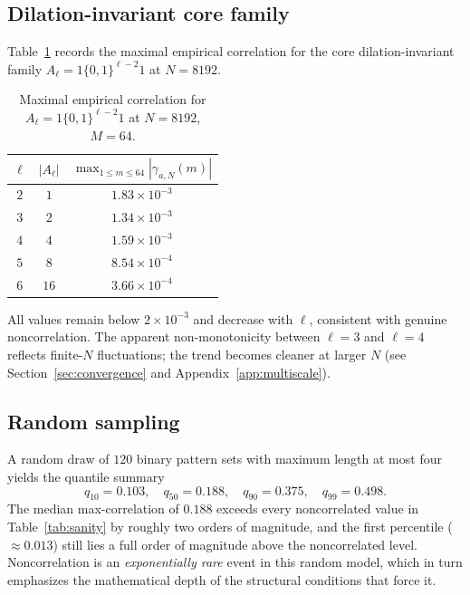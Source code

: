 \documentclass[11pt]{article}
\theoremstyle{definition}
\begin{document}
\subsection{Dilation-invariant core family}

Table~\ref{tab:family} records the maximal empirical correlation for
the core dilation-invariant family $A_\ell = 1\{0,1\}^{\ell-2}1$
at $N = 8192$.

\begin{table}[ht]
\centering
\caption{Maximal empirical correlation for $A_\ell = 1\{0,1\}^{\ell-2}1$
         at $N = 8192$, $M = 64$.}
\label{tab:family}
\begin{tabular}{ccc}
\toprule
$\ell$ & $|A_\ell|$
       & $\displaystyle\max_{1 \leq m \leq 64}|\gamma_{a,N}(m)|$ \\
\midrule
$2$ & $1$  & $1.83 \times 10^{-3}$ \\
$3$ & $2$  & $1.34 \times 10^{-3}$ \\
$4$ & $4$  & $1.59 \times 10^{-3}$ \\
$5$ & $8$  & $8.54 \times 10^{-4}$ \\
$6$ & $16$ & $3.66 \times 10^{-4}$ \\
\bottomrule
\end{tabular}
\end{table}

All values remain below $2 \times 10^{-3}$ and decrease with $\ell$,
consistent with genuine noncorrelation. The apparent non-monotonicity
between $\ell = 3$ and $\ell = 4$ reflects finite-$N$ fluctuations; the
trend becomes cleaner at larger $N$ (see Section~\ref{sec:convergence}
and Appendix~\ref{app:multiscale}).

\subsection{Random sampling}

A random draw of $120$ binary pattern sets with maximum length at most
four yields the quantile summary
\[
    q_{10} = 0.103,\quad
    q_{50} = 0.188,\quad
    q_{90} = 0.375,\quad
    q_{99} = 0.498.
\]
The median max-correlation of $0.188$ exceeds every noncorrelated
value in Table~\ref{tab:sanity} by roughly two orders of magnitude,
and the first percentile ($\approx 0.013$) still lies a full order of
magnitude above the noncorrelated level. Noncorrelation is
an \emph{exponentially rare} event in this random model, which in turn
emphasizes the mathematical depth of the structural conditions that
force it.
\end{document}
